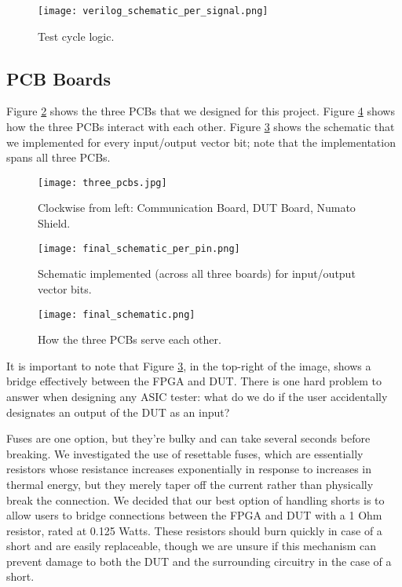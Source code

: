 \begin{figure}
\texttt{[image: verilog\_schematic\_per\_signal.png]}
\caption{Test cycle logic.}
\label{fig:test_cycle_logic}
\end{figure}

\subsection{PCB Boards}
Figure \ref{fig:three_pcbs} shows the three PCBs that we designed for this project. Figure \ref{fig:final_schematic} shows how the three PCBs interact with each other. Figure \ref{fig:final_schematic_per_pin} shows the schematic that we implemented for every input/output vector bit; note that the implementation spans all three PCBs.

\begin{figure}
\texttt{[image: three\_pcbs.jpg]}
\caption{Clockwise from left: Communication Board, DUT Board, Numato Shield.}
\label{fig:three_pcbs}
\end{figure}

\begin{figure}
\texttt{[image: final\_schematic\_per\_pin.png]}
\caption{Schematic implemented (across all three boards) for input/output vector bits.}
\label{fig:final_schematic_per_pin}
\end{figure}

\begin{figure}
\texttt{[image: final\_schematic.png]}
\caption{How the three PCBs serve each other.}
\label{fig:final_schematic}
\end{figure}

It is important to note that Figure \ref{fig:final_schematic_per_pin}, in the top-right of the image, shows a bridge effectively between the FPGA and DUT. There is one hard problem to answer when designing any ASIC tester: what do we do if the user accidentally designates an output of the DUT as an input? 

Fuses are one option, but they're bulky and can take several seconds before breaking. We investigated the use of resettable fuses, which are essentially resistors whose resistance increases exponentially in response to increases in thermal energy, but they merely taper off the current rather than physically break the connection. We decided that our best option of handling shorts is to allow users to bridge connections between the FPGA and DUT with a 1 Ohm resistor, rated at 0.125 Watts. These resistors should burn quickly in case of a short and are easily replaceable, though we are unsure if this mechanism can prevent damage to both the DUT and the surrounding circuitry in the case of a short.

